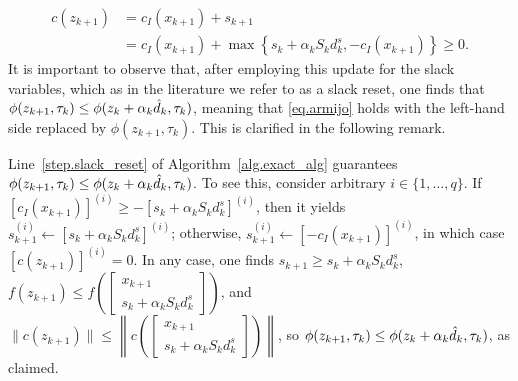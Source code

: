 \begin{equation}\label{eq.slack_reset}
  \begin{aligned}
    c(z_{k+1}) &= c_I(x_{k+1}) + s_{k+1}\\
    &= c_I(x_{k+1}) + \max \left\{s_k + \alpha_k S_k d_k^s, - c_I(x_{k+1})\right\} \geq 0. 
  \end{aligned}
\end{equation}
It is important to observe that, after employing this update for the slack variables, which as in the literature we refer to as a slack reset, one finds that $\phi(z_{k+1},\tau_k) \leq \phi(z_k + \alpha_k  {\hat d}_k, \tau_k)$, meaning that \eqref{eq.armijo} holds with the left-hand side replaced by $\phi(z_{k+1},\tau_k)$.  This is clarified in the following remark.

\begin{remark}\label{remark.slackreset}
  Line~\ref{step.slack_reset} of Algorithm~\ref{alg.exact_alg} guarantees $\phi(z_{k+1},\tau_k) \leq \phi(z_k + \alpha_k  {\hat d}_k, \tau_k)$.  To see this, consider arbitrary $i \in \{1,\dots,q\}$.  If $[c_I(x_{k+1})]^{(i)} \geq -[s_k + \alpha_k S_k d_k^s]^{(i)}$, then it yields $s_{k+1}^{(i)} \gets [s_k + \alpha_k S_k d_k^s]^{(i)}$; otherwise, $s_{k+1}^{(i)} \gets [-c_I(x_{k+1})]^{(i)}$, in which case $[c(z_{k+1})]^{(i)} = 0$.  In any case, one finds $s_{k+1} \geq s_k + \alpha_k S_k d_k^s$, $f(z_{k+1}) \leq f\left(\begin{bmatrix} x_{k+1} \\ s_k + \alpha_k S_k d_k^s \end{bmatrix}\right)$, and $\|c(z_{k+1})\| \leq \left\|c\left(\begin{bmatrix} x_{k+1} \\ s_k + \alpha_k S_k d_k^s \end{bmatrix}\right) \right\|$, so $\phi(z_{k+1},\tau_k) \leq \phi(z_k + \alpha_k  {\hat d}_k, \tau_k)$, as claimed.
\end{remark}

